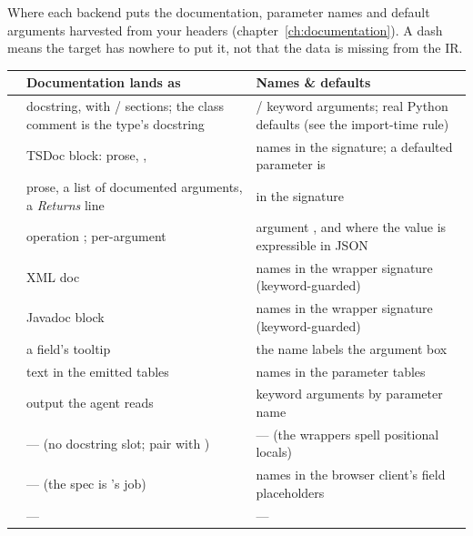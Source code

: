 Where each backend puts the documentation, parameter names and default
arguments harvested from your headers (chapter~\ref{ch:documentation}). A dash
means the target has nowhere to put it, not that the data is missing from the
IR.

\begin{center}
\small
\begin{longtable}{@{}lL{5.6cm}L{5.0cm}@{}}
\toprule
\textbf{} & \textbf{Documentation lands as} &
  \textbf{Names \& defaults} \\
\midrule
\endhead
{}  & docstring, with  /
   sections; the class comment is the type's docstring &
   /  keyword arguments; real Python defaults
  (see the import-time rule) \\
\addlinespace
{} & TSDoc block: prose, ,  &
  names in the signature; a defaulted parameter is  \\
\addlinespace
{}  & prose, a list of documented arguments, a
  \emph{Returns} line &  in the signature \\
\addlinespace
{} & operation ; per-argument
   & argument , and  where the
  value is expressible in JSON \\
\addlinespace
{} &  XML doc & names in the wrapper
  signature (keyword-guarded) \\
\addlinespace
{} & Javadoc block & names in the wrapper signature
  (keyword-guarded) \\
\addlinespace
{}   & a field's tooltip & the name labels the
  argument box \\
\addlinespace
{} & text in the emitted  tables & names in the
  parameter tables \\
\addlinespace
{} &  output the agent reads & keyword
  arguments by parameter name \\
\addlinespace
{}    & --- (no docstring slot;
  pair with ) & --- (the wrappers spell positional locals) \\
\addlinespace
{} & --- (the spec is 's job) & names in the
  browser client's field placeholders \\
\addlinespace
{}  & --- & --- \\
\bottomrule
\end{longtable}
\end{center}

